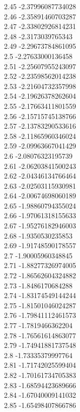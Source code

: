 {2.45	-2.37996087734028\\
2.46	-2.35891460703287\\
2.47	-2.33802926814231\\
2.48	-2.3173039765343\\
2.49	-2.29673784861095\\
2.5	-2.27633000136458\\
2.51	-2.25607955243097\\
2.52	-2.23598562014238\\
2.53	-2.21604732357998\\
2.54	-2.19626378262604\\
2.55	-2.17663411801559\\
2.56	-2.15715745138766\\
2.57	-2.13783290533616\\
2.58	-2.11865960346024\\
2.59	-2.09963667041429\\
2.6	-2.08076323195739\\
2.61	-2.06203841500243\\
2.62	-2.04346134766464\\
2.63	-2.02503115930981\\
2.64	-2.00674698060189\\
2.65	-1.98860794355024\\
2.66	-1.97061318155633\\
2.67	-1.95276182946003\\
2.68	-1.9350530235853\\
2.69	-1.91748590178557\\
2.7	-1.90005960348845\\
2.71	-1.88277326974005\\
2.72	-1.86562604324882\\
2.73	-1.8486170684288\\
2.74	-1.83174549144244\\
2.75	-1.81501046024287\\
2.76	-1.79841112461573\\
2.77	-1.7819466362204\\
2.78	-1.76561614863077\\
2.79	-1.74941881737548\\
2.8	-1.73335379997764\\
2.81	-1.71742025599404\\
2.82	-1.70161734705383\\
2.83	-1.68594423689666\\
2.84	-1.67040009141032\\
2.85	-1.65498407866786\\
}
